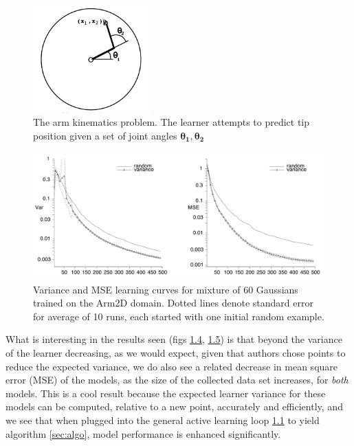 \documentclass[
  letterpaper,
  DIV=11,
  numbers=noendperiod,
  oneside]{scrreprt}
\theoremstyle{remark}
\begin{document}
\begin{figure}

{\centering \includegraphics[width=0.4\textwidth,height=\textheight]{src/Figures/1_experiment_setup.png}

}

\caption{The arm kinematics problem. The learner attempts to predict tip
position given a set of joint angles
\(\mathbf{\theta_1}, \mathbf{\theta_2}\)}

\end{figure}%
\begin{figure}

{\centering \includegraphics[width=1\textwidth,height=\textheight]{src/Figures/1_experiment_results_gaussian.png}

}

\caption{Variance and MSE learning curves for mixture of 60 Gaussians
trained on the Arm2D domain. Dotted lines denote standard error for
average of 10 runs, each started with one initial random example.}

\end{figure}%

What is interesting in the results seen (figs
\hyperref[fig:empirical:gauss]{1.4},
\hyperref[fig:empirical:regress]{1.5}) is that beyond the variance of
the learner decreasing, as we would expect, given that authors chose
points to reduce the expected variance, we do also see a related
decrease in mean square error (MSE) of the models, as the size of the
collected data set increases, for \emph{both} models. This is a cool
result because the expected learner variance for these models can be
computed, relative to a new point, accurately and efficiently, and we
see that when plugged into the general active learning loop
\hyperref[fig:schema]{1.1} to yield algorithm
\hyperref[sec:algo]{{[}sec:algo{]}}, model performance is enhanced
significantly.
\end{document}
